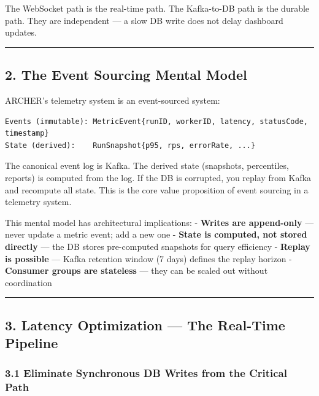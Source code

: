 \documentclass[
]{article}
\begin{document}
The WebSocket path is the real-time path. The Kafka-to-DB path is the
durable path. They are independent --- a slow DB write does not delay
dashboard updates.

\begin{center}\rule{0.5\linewidth}{0.5pt}\end{center}

\hypertarget{the-event-sourcing-mental-model}{%
\subsection{2. The Event Sourcing Mental
Model}\label{the-event-sourcing-mental-model}}

ARCHER's telemetry system is an event-sourced system:

\begin{verbatim}
Events (immutable): MetricEvent{runID, workerID, latency, statusCode, timestamp}
State (derived):    RunSnapshot{p95, rps, errorRate, ...}
\end{verbatim}

The canonical event log is Kafka. The derived state (snapshots,
percentiles, reports) is computed from the log. If the DB is corrupted,
you replay from Kafka and recompute all state. This is the core value
proposition of event sourcing in a telemetry system.

This mental model has architectural implications: - \textbf{Writes are
append-only} --- never update a metric event; add a new one -
\textbf{State is computed, not stored directly} --- the DB stores
pre-computed snapshots for query efficiency - \textbf{Replay is
possible} --- Kafka retention window (7 days) defines the replay horizon
- \textbf{Consumer groups are stateless} --- they can be scaled out
without coordination

\begin{center}\rule{0.5\linewidth}{0.5pt}\end{center}

\hypertarget{latency-optimization-the-real-time-pipeline}{%
\subsection{3. Latency Optimization --- The Real-Time
Pipeline}\label{latency-optimization-the-real-time-pipeline}}

\hypertarget{eliminate-synchronous-db-writes-from-the-critical-path}{%
\subsubsection{3.1 Eliminate Synchronous DB Writes from the Critical
Path}\label{eliminate-synchronous-db-writes-from-the-critical-path}}
\end{document}
